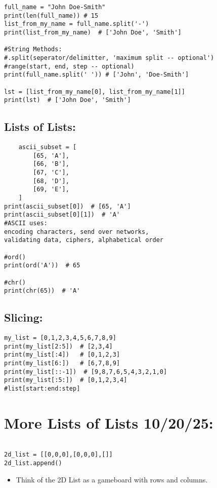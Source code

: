 \documentclass[11pt]{article}
\begin{document}
\begin{verbatim}
full_name = "John Doe-Smith"
print(len(full_name)) # 15
list_from_my_name = full_name.split('-') 
print(list_from_my_name)  # ['John Doe', 'Smith']

#String Methods:
#.split(seperator/delimitter, 'maximum split -- optional')
#range(start, end, step -- optional)
print(full_name.split(' ')) # ['John', 'Doe-Smith']

lst = [list_from_my_name[0], list_from_my_name[1]]
print(lst)  # ['John Doe', 'Smith']
\end{verbatim}

\subsection*{Lists of Lists:}
\begin{verbatim}
    ascii_subset = [
        [65, 'A'],
        [66, 'B'],
        [67, 'C'],
        [68, 'D'],
        [69, 'E'],
    ]
print(ascii_subset[0])  # [65, 'A']
print(ascii_subset[0][1])  # 'A'
#ASCII uses:
encoding characters, send over networks, 
validating data, ciphers, alphabetical order

#ord()
print(ord('A'))  # 65

#chr()
print(chr(65))  # 'A'
\end{verbatim}

\subsection*{Slicing:}
\begin{verbatim}
my_list = [0,1,2,3,4,5,6,7,8,9]
print(my_list[2:5])  # [2,3,4]
print(my_list[:4])   # [0,1,2,3]
print(my_list[6:])   # [6,7,8,9]
print(my_list[::-1])  # [9,8,7,6,5,4,3,2,1,0]
print(my_list[:5:])  # [0,1,2,3,4]
#list[start:end:step]
\end{verbatim}

\section{More Lists of Lists 10/20/25:}
\begin{verbatim}

2d_list = [[0,0,0],[0,0,0],[]]
2d_list.append()

\end{verbatim}

\begin{itemize}

\item Think of the 2D List as a gameboard with rows and columns. 
\end{itemize}
\end{document}
